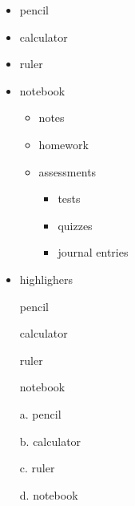 \documentclass[11pt]{article}
\begin{document}
\begin{itemize} %
    \item pencil
    \item calculator
    \item ruler
    \item notebook
    \begin{itemize} %
        \item notes
        \item homework
        \item assessments
        \begin{itemize}
            \item tests
            \item quizzes
            \item journal entries
        \end{itemize}
    \end{itemize}
    \item highlighers
\end{itemize}

\vspace{1cm}

\begin{enumerate} 
    \item[] pencil %
    \item[] calculator
    \item[] ruler
    \item[] notebook
\end{enumerate}

\vspace{1cm}

\begin{enumerate} 
    \item[a.] pencil %
    \item[b.] calculator
    \item[c.] ruler
    \item[d.] notebook
\end{enumerate}
\end{document}
